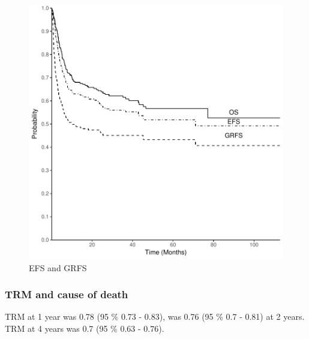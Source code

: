 \documentclass[a4paper,11pt] {article}
\begin{document}
\begin{figure}[h]
\begin{center}
\includegraphics{Rapport-fig2}
\end{center}
\caption{EFS and GRFS}
\label{fig2}
\end{figure}



\pagebreak
\subsubsection{TRM and cause of death }


TRM at 1 year was 0.78 (95 \% 0.73 - 0.83), was 0.76 (95 \% 0.7 - 0.81) at 2 years. TRM at 4 years was 0.7 (95 \% 0.63 - 0.76).
\end{document}
